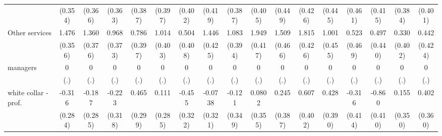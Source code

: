 {\begin{tabular}{l*{16}{c}}
                    &     (0.354)         &     (0.366)         &     (0.363)         &     (0.387)         &     (0.397)         &     (0.402)         &     (0.419)         &     (0.387)         &     (0.405)         &     (0.449)         &     (0.426)         &     (0.445)         &     (0.461)         &     (0.415)         &     (0.384)         &     (0.401)         \\
[1em]
Other services      &       1.476\sym{***}&       1.360\sym{***}&       0.968\sym{**} &       0.786\sym{*}  &       1.014\sym{*}  &       0.504         &       1.446\sym{***}&       1.083\sym{**} &       1.949\sym{***}&       1.509\sym{**} &       1.815\sym{***}&       1.001\sym{*}  &       0.523         &       0.497         &       0.330         &       0.442         \\
                    &     (0.356)         &     (0.376)         &     (0.373)         &     (0.397)         &     (0.403)         &     (0.408)         &     (0.425)         &     (0.394)         &     (0.417)         &     (0.466)         &     (0.426)         &     (0.455)         &     (0.469)         &     (0.440)         &     (0.402)         &     (0.424)         \\
[1em]
managers            &           0         &           0         &           0         &           0         &           0         &           0         &           0         &           0         &           0         &           0         &           0         &           0         &           0         &           0         &           0         &           0         \\
                    &         (.)         &         (.)         &         (.)         &         (.)         &         (.)         &         (.)         &         (.)         &         (.)         &         (.)         &         (.)         &         (.)         &         (.)         &         (.)         &         (.)         &         (.)         &         (.)         \\
[1em]
white collar - prof.&      -0.316         &      -0.187         &      -0.223         &       0.465         &       0.111         &      -0.455         &     -0.0738         &      -0.121         &      0.0802         &       0.245         &       0.607         &       0.428         &      -0.316         &      -0.860\sym{*}  &       0.155         &       0.402         \\
                    &     (0.284)         &     (0.285)         &     (0.318)         &     (0.299)         &     (0.285)         &     (0.322)         &     (0.321)         &     (0.349)         &     (0.355)         &     (0.387)         &     (0.402)         &     (0.390)         &     (0.414)         &     (0.410)         &     (0.350)         &     (0.360)         \\

\end{tabular}}
